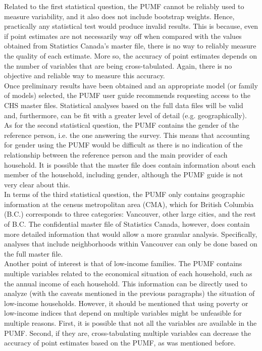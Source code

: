 \documentclass[11pt]{article}
\begin{document}
Related to the first statistical question, the PUMF cannot be reliably used
to measure variability, and it also does not include bootstrap weights.
Hence, practically any statistical test would produce invalid results.
This is because, even if point estimates are not necessarily way off
when compared with the values obtained from Statistics Canada's master file,
there is no way to reliably measure the quality of each estimate.
More so, the accuracy of point estimates depends on the number of variables
that are being cross-tabulated. Again, there is no objective and reliable way
to measure this accuracy.
\\

Once preliminary results have been obtained and an appropriate model
(or family of models) selected, the PUMF user guide \cite{chsguide} recommends
requesting access to the CHS master files. Statistical analyses based on
the full data files will be valid and, furthermore, can be fit
with a greater level of detail (e.g. geographically).
\\

As for the second statistical question, the PUMF contains the gender
of the reference person, i.e. the one answering the survey.
This means that accounting for gender using the PUMF would be difficult
as there is no indication of the relationship between the reference person
and the main provider of each household. It is possible that the master file
does contain information about each member of the household, including gender,
although the PUMF guide is not very clear about this.
\\

In terms of the third statistical question, the PUMF only
contains geographic information at the census metropolitan area (CMA),
which for British Columbia (B.C.) corresponds to three categories:
Vancouver, other large cities, and the rest of B.C. The confidential
master file of Statistics Canada, however, does contain more detailed
information that would allow a more granular analysis.
Specifically, analyses that include neighborhoods within Vancouver can only
be done based on the full master file.
\\

Another point of interest is that of low-income families. The PUMF contains
multiple variables related to the economical situation of each household,
such as the annual income of each household. This information can be directly
used to analyze (with the caveats mentioned in the previous paragraphs)
the situation of low-income households. However, it should be mentioned that
using poverty or low-income indices that depend on multiple variables might
be unfeasible for multiple reasons. First, it is possible that not all the
variables are available in the PUMF. Second, if they are, cross-tabulating
multiple variables can decrease the accuracy of point estimates based on
the PUMF, as was mentioned before.
\\
\end{document}
